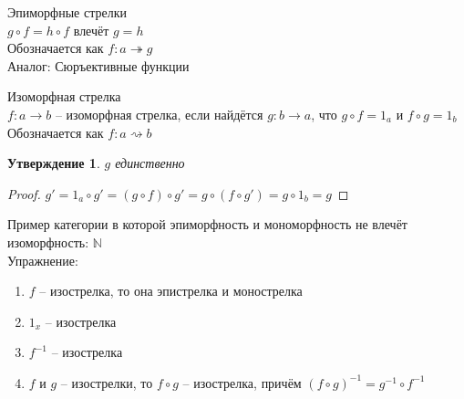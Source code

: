 \documentclass[a4paper, fleqn, draft]{report}
\newtheorem*{stmt}{Утверждение}
\begin{document}
Эпиморфные стрелки \\
$g \circ f = h \circ f$ влечёт $g = h$ \\
Обозначается как $f\colon a \twoheadrightarrow g$ \\
Аналог: Сюръективные функции

Изоморфная стрелка \\
$f\colon a \to b$ -- изоморфная стрелка, если найдётся $g\colon b \to a$, что
$g \circ f = 1_a$ и $f \circ g = 1_b$ \\
Обозначается как $f\colon a \rightsquigarrow b$ \\
\begin{stmt}
  $g$ единственно
\end{stmt}
\begin{proof}
  $g' = 1_a \circ g' = (g \circ f) \circ g' = g \circ (f \circ g') = g \circ 1_b = g$
\end{proof}

Пример категории в которой эпиморфность и мономорфность не влечёт изоморфность:
$\mathbb{N}$ \\
Упражнение: \\
\begin{enumerate}
  \item $f$ -- изострелка, то она эпистрелка и монострелка \\
  \item $1_x$ -- изострелка \\
  \item $f^{-1}$ -- изострелка \\
  \item $f$ и $g$ -- изострелки, то $f \circ g$ -- изострелка, причём
        $(f \circ g)^{-1} = g^{-1} \circ f^{-1}$ \\
\end{enumerate}
\end{document}
